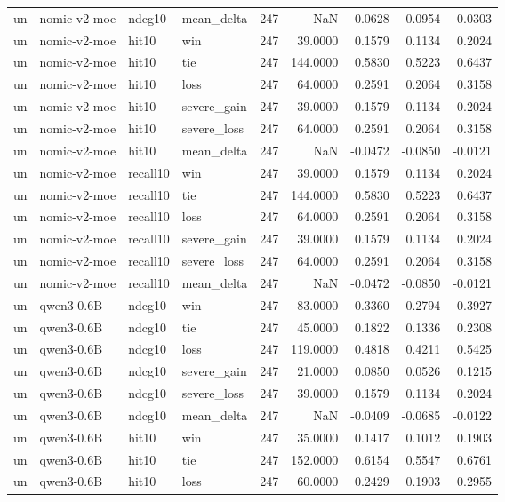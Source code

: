 \begin{tabular}{llllrrrrr}
un & nomic-v2-moe & ndcg10 & mean\_delta & 247 & NaN & -0.0628 & -0.0954 & -0.0303 \\
un & nomic-v2-moe & hit10 & win & 247 & 39.0000 & 0.1579 & 0.1134 & 0.2024 \\
un & nomic-v2-moe & hit10 & tie & 247 & 144.0000 & 0.5830 & 0.5223 & 0.6437 \\
un & nomic-v2-moe & hit10 & loss & 247 & 64.0000 & 0.2591 & 0.2064 & 0.3158 \\
un & nomic-v2-moe & hit10 & severe\_gain & 247 & 39.0000 & 0.1579 & 0.1134 & 0.2024 \\
un & nomic-v2-moe & hit10 & severe\_loss & 247 & 64.0000 & 0.2591 & 0.2064 & 0.3158 \\
un & nomic-v2-moe & hit10 & mean\_delta & 247 & NaN & -0.0472 & -0.0850 & -0.0121 \\
un & nomic-v2-moe & recall10 & win & 247 & 39.0000 & 0.1579 & 0.1134 & 0.2024 \\
un & nomic-v2-moe & recall10 & tie & 247 & 144.0000 & 0.5830 & 0.5223 & 0.6437 \\
un & nomic-v2-moe & recall10 & loss & 247 & 64.0000 & 0.2591 & 0.2064 & 0.3158 \\
un & nomic-v2-moe & recall10 & severe\_gain & 247 & 39.0000 & 0.1579 & 0.1134 & 0.2024 \\
un & nomic-v2-moe & recall10 & severe\_loss & 247 & 64.0000 & 0.2591 & 0.2064 & 0.3158 \\
un & nomic-v2-moe & recall10 & mean\_delta & 247 & NaN & -0.0472 & -0.0850 & -0.0121 \\
un & qwen3-0.6B & ndcg10 & win & 247 & 83.0000 & 0.3360 & 0.2794 & 0.3927 \\
un & qwen3-0.6B & ndcg10 & tie & 247 & 45.0000 & 0.1822 & 0.1336 & 0.2308 \\
un & qwen3-0.6B & ndcg10 & loss & 247 & 119.0000 & 0.4818 & 0.4211 & 0.5425 \\
un & qwen3-0.6B & ndcg10 & severe\_gain & 247 & 21.0000 & 0.0850 & 0.0526 & 0.1215 \\
un & qwen3-0.6B & ndcg10 & severe\_loss & 247 & 39.0000 & 0.1579 & 0.1134 & 0.2024 \\
un & qwen3-0.6B & ndcg10 & mean\_delta & 247 & NaN & -0.0409 & -0.0685 & -0.0122 \\
un & qwen3-0.6B & hit10 & win & 247 & 35.0000 & 0.1417 & 0.1012 & 0.1903 \\
un & qwen3-0.6B & hit10 & tie & 247 & 152.0000 & 0.6154 & 0.5547 & 0.6761 \\
un & qwen3-0.6B & hit10 & loss & 247 & 60.0000 & 0.2429 & 0.1903 & 0.2955 \\

\end{tabular}
